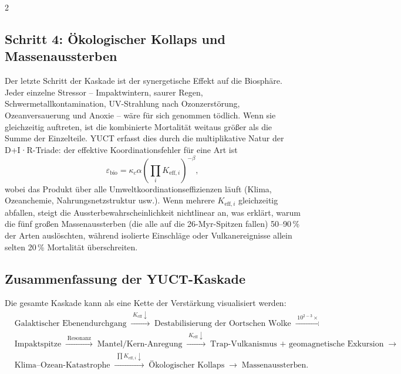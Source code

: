 \documentclass[11pt,a4paper]{article}
\begin{document}
\begin{multicols}{2}
		\subsection{Schritt 4: Ökologischer Kollaps und Massenaussterben}
		
		Der letzte Schritt der Kaskade ist der synergetische Effekt auf die Biosphäre.
		Jeder einzelne Stressor – Impaktwintern, saurer Regen, Schwermetallkontamination,
		UV-Strahlung nach Ozonzerstörung, Ozeanversauerung und Anoxie – wäre für sich genommen tödlich.
		Wenn sie gleichzeitig auftreten, ist die kombinierte Mortalität weitaus größer als die Summe der Einzelteile.
		YUCT erfasst dies durch die multiplikative Natur der D+I·R-Triade:
		der effektive Koordinationsfehler für eine Art ist
		\[
		\varepsilon_{\text{bio}} = \kappa_c \alpha \left( \prod_{i} K_{\mathrm{eff},i} \right)^{-\beta},
		\]
		wobei das Produkt über alle Umweltkoordinationseffizienzen läuft
		(Klima, Ozeanchemie, Nahrungsnetzstruktur usw.). Wenn mehrere
		\(K_{\mathrm{eff},i}\) gleichzeitig abfallen, steigt die Aussterbewahrscheinlichkeit
		nichtlinear an, was erklärt, warum die fünf großen Massenaussterben
		(die alle auf die 26-Myr-Spitzen fallen) 50–90 \% der Arten auslöschten,
		während isolierte Einschläge oder Vulkanereignisse allein selten 20 \% Mortalität überschreiten.
		
	\end{multicols}
	
	\subsection{Zusammenfassung der YUCT-Kaskade}
	
	Die gesamte Kaskade kann als eine Kette der Verstärkung visualisiert werden:
	{\small
		\[
		\begin{aligned}
			&\text{Galaktischer Ebenendurchgang}
			\;\xrightarrow{\;K_{\mathrm{eff}}\downarrow\;}\;
			\text{Destabilisierung der Oortschen Wolke}
			\;\xrightarrow{\;10^{2-3}\times\;}\\
			&\text{Impaktspitze}
			\;\xrightarrow{\;\text{Resonanz}\;}\;
			\text{Mantel/Kern-Anregung}
			\;\xrightarrow{\;K_{\mathrm{eff}}\downarrow\;}\;
			\text{Trap-Vulkanismus + geomagnetische Exkursion}
			\;\xrightarrow{\;}\\
			&\text{Klima–Ozean-Katastrophe}
			\;\xrightarrow{\;\prod K_{\mathrm{eff},i}\downarrow\;}\;
			\text{Ökologischer Kollaps}
			\;\xrightarrow{\;}\;
			\text{Massenaussterben}.
		\end{aligned}
		\]
	}
	
\end{document}
